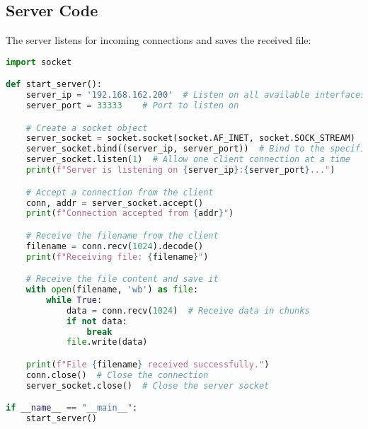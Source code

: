 \documentclass{article}
\begin{document}
\subsection{Server Code}
The server listens for incoming connections and saves the received file:
\begin{lstlisting}[language=Python]
import socket

def start_server():
    server_ip = '192.168.162.200'  # Listen on all available interfaces
    server_port = 33333    # Port to listen on

    # Create a socket object
    server_socket = socket.socket(socket.AF_INET, socket.SOCK_STREAM)
    server_socket.bind((server_ip, server_port))  # Bind to the specified IP and port
    server_socket.listen(1)  # Allow one client connection at a time
    print(f"Server is listening on {server_ip}:{server_port}...")

    # Accept a connection from the client
    conn, addr = server_socket.accept()
    print(f"Connection accepted from {addr}")

    # Receive the filename from the client
    filename = conn.recv(1024).decode()
    print(f"Receiving file: {filename}")

    # Receive the file content and save it
    with open(filename, 'wb') as file:
        while True:
            data = conn.recv(1024)  # Receive data in chunks
            if not data:
                break
            file.write(data)

    print(f"File {filename} received successfully.")
    conn.close()  # Close the connection
    server_socket.close()  # Close the server socket

if __name__ == "__main__":
    start_server()
\end{lstlisting}
\end{document}
